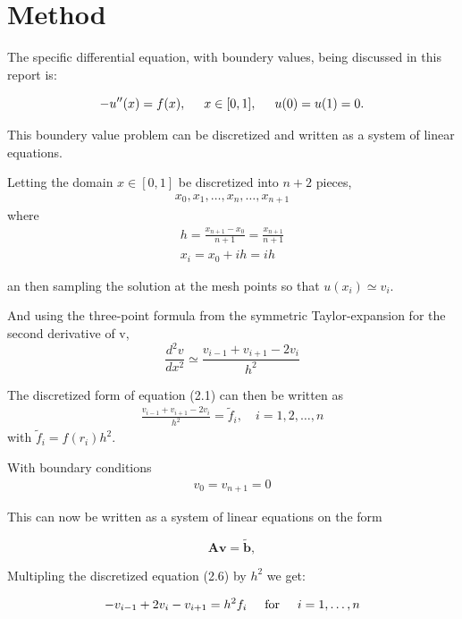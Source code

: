 \documentclass[11pt,a4paper,english,draft]{article}
\numberwithin{equation}{section}
\newcommand{\ve}[1]{\mathbf{#1}} %
\newcommand{\spac}{\hspace{5mm}}
\begin{document}
\section{Method}

The specific differential equation, with boundery values, being discussed in this report is: 

\begin{equation}
-u''(x) = f(x), \spac x \in [0,1], \spac u(0) = u(1) = 0.
\end{equation}

This boundery value problem can be discretized and written as a system of linear equations.

Letting the domain $x \in [0,1]$ be discretized into $n+2$ pieces,
\begin{gather}
x_0, x_1, \dots, x_{n}, \dots, x_{n+1}
\end{gather}
where 
\begin{gather}
h = \frac{x_{n+1} - x_0}{n+1} = \frac{x_{n+1}}{n+1}\\
x_i = x_0 + ih = ih
\end{gather}

an then sampling the solution at the mesh points so that $u(x_i) \simeq v_i$.

And using the three-point formula from the symmetric 
Taylor-expansion for the second derivative of v,
\begin{equation}
\frac{d^2v}{dx^2} \simeq \frac{v_{i-1} + v_{i+1} - 2v_i}{h^2}
\end{equation}

The discretized form of equation (2.1) can then be written as
\begin{gather}
\frac{v_{i-1} + v_{i+1} - 2v_i}{h^2} = \tilde{f}_i , \quad i=1,2, \dots, n 
\end{gather}
with $\tilde{f}_i = f(r_i) h^2$.

With boundary conditions 
\begin{gather}
v_0 = v_{n+1} = 0
\end{gather}

This can now be written as a system of linear equations on the form 

\begin{equation}
   \ve{A}\ve{v} = \tilde{\ve{b}},
   \label{eq:Avb}
\end{equation}

Multipling the discretized equation (2.6) by $h^2$ we get:

\begin{gather*}
   -v_{i-1}+2v_{i}-v_{i+1}=h^2 f_i \hspace{0.5cm} \mathrm{for} \hspace{0.5cm} i=1,\dots, n 
\end{gather*}
\end{document}
